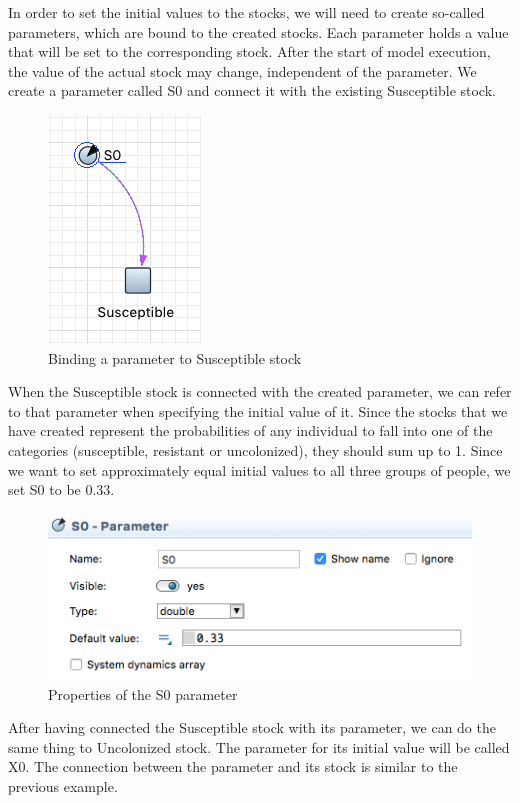 In order to set the initial values to the stocks, we will need to create so-called parameters, which are bound to the created stocks. Each parameter holds a value that will be set to the corresponding stock. After the start of model execution, the value of the actual stock may change, independent of the parameter. We create a parameter called S0 and connect it with the existing Susceptible stock.

\begin{figure}[H]
  \centering
  \includegraphics[height=0.3\textwidth]{img/screens/basic/basic8}
  \caption{Binding a parameter to Susceptible stock}
\end{figure}

When the Susceptible stock is connected with the created parameter, we can refer to that parameter when specifying the initial value of it. Since the stocks that we have created represent the probabilities of any individual to fall into one of the categories (susceptible, resistant or uncolonized), they should sum up to 1. Since we want to set approximately equal initial values to all three groups of people, we set S0 to be 0.33.

\begin{figure}[H]
  \centering
  \includegraphics[height=0.3\textwidth]{img/screens/basic/basic7}
  \caption{Properties of the S0 parameter}
\end{figure}

After having connected the Susceptible stock with its parameter, we can do the same thing to Uncolonized stock. The parameter for its initial value will be called X0. The connection between the parameter and its stock is similar to the previous example.

